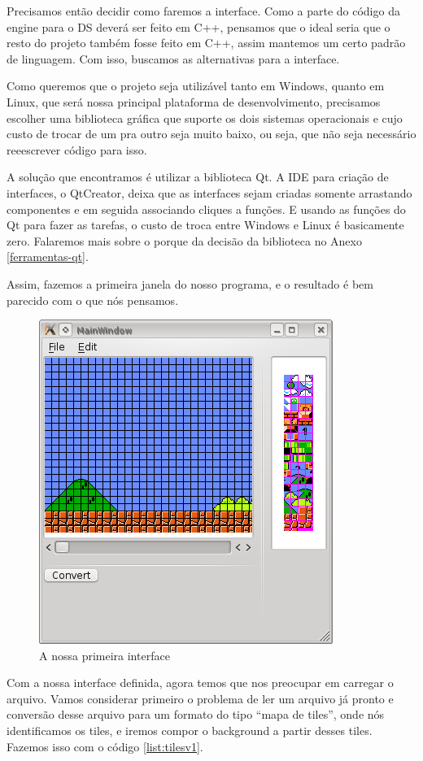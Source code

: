 \documentclass[brazil]{abnt}
\begin{document}
Precisamos então decidir como faremos a interface. Como a parte do código da engine para o DS deverá ser feito em C++, pensamos que o ideal seria que o resto do projeto também fosse feito em C++, assim mantemos um certo padrão de linguagem. Com isso, buscamos as alternativas para a interface.

Como queremos que o projeto seja utilizável tanto em Windows, quanto em Linux, que será nossa principal plataforma de desenvolvimento, precisamos escolher uma biblioteca gráfica que suporte os dois sistemas operacionais e cujo custo de trocar de um pra outro seja muito baixo, ou seja, que não seja necessário reeescrever código para isso.

A solução que encontramos é utilizar a biblioteca Qt. A IDE para criação de interfaces, o QtCreator, deixa que as interfaces sejam criadas somente arrastando componentes e em seguida associando cliques a funções. E usando as funções do Qt para fazer as tarefas, o custo de troca entre Windows e Linux é basicamente zero. Falaremos mais sobre o porque da decisão da biblioteca no Anexo \ref{ferramentas-qt}.

Assim, fazemos a primeira janela do nosso programa, e o resultado é bem parecido com o que nós pensamos.

\begin{figure}[h!]
\centering
\includegraphics{imgs/mainwindow_1.png}
\caption{A nossa primeira interface} 
\end{figure}

Com a nossa interface definida, agora temos que nos preocupar em carregar o arquivo. Vamos considerar primeiro o problema de ler um arquivo já pronto e conversão desse arquivo para um formato do tipo ``mapa de tiles'', onde nós identificamos os tiles, e iremos compor o background a partir desses tiles. Fazemos isso com o código \ref{list:tilesv1}.
\end{document}
